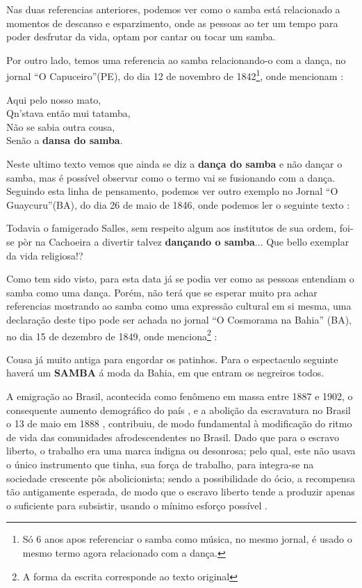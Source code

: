 Nas duas referencias anteriores, 
podemos ver como o samba está relacionado a momentos de descanso e esparzimento, 
onde as pessoas ao ter um tempo para poder desfrutar da vida,
optam por cantar ou tocar um samba.

Por outro lado, temos uma referencia ao samba relacionando-o com a dança, no jornal ``O Capuceiro''(PE),
do dia 12 de novembro de 1842\footnote{Só 6 anos apos referenciar o samba como música, 
no mesmo jornal, é usado o mesmo termo agora relacionado com a dança.}, 
onde mencionam \cite[pp. 5]{sambaperiodicoocapuceiro2}:
\begin{citando}%
Aqui pelo nosso mato,\\
Qn'stava então mui tatamba,\\
Não se sabia outra cousa,\\
Senão a \textbf{dansa do samba}.
\end{citando}
Neste ultimo texto vemos que ainda se diz a \textbf{dança do samba} e não dançar o samba,
mas é possível observar como o termo vai se fusionando com a dança.
Seguindo esta linha de pensamento, 
podemos ver outro exemplo no Jornal ``O Guaycuru''(BA), do dia 26 de maio de 1846,
onde podemos ler o seguinte texto \cite[pp. 2]{sambaperiodicooguaycuru}:
\begin{citando}%
Todavia o famigerado Salles, sem respeito algum aos institutos de sua ordem, 
foi-se pòr na Cachoeira a divertir talvez \textbf{dançando o samba}...
Que bello exemplar da vida religiosa!?
\end{citando}
Como tem sido visto, 
para esta data já se podia ver como as pessoas entendiam o samba como uma dança.
Porém, não terá que se esperar muito pra achar referencias mostrando ao samba
como uma expressão cultural em si mesma, 
uma declaração deste tipo pode ser achada no jornal ``O Cosmorama na Bahia'' (BA), 
no dia 15 de dezembro de 1849, onde menciona\footnote{\label{footort3}A forma da escrita corresponde ao texto original} \cite[pp. 2]{sambaperiodicoocosmorama}:
\begin{citando}%
Cousa já muito antiga para engordar os patinhos. 
Para o espectaculo seguinte haverá um \textbf{SAMBA} á moda da Bahia, 
em que entram os negreiros todos.
\end{citando}



A emigração ao Brasil, acontecida como fenômeno em massa   entre 1887 e 1902,
o consequente aumento demográfico do país \cite[pp. 18]{trento1989outro}, e 
a abolição da escravatura no Brasil o 13 de maio em 1888 \cite[pp. 117]{dorigny2019abolicoes},
contribuiu, de modo fundamental à modificação do ritmo de vida das comunidades
afrodescendentes no Brasil.
Dado que para o escravo liberto, o trabalho era uma marca indigna ou desonrosa;
pelo qual, este não usava  o único instrumento que tinha, sua força de trabalho, 
para  integra-se na sociedade crescente pôs abolicionista; 
sendo a possibilidade do ócio, a recompensa tão antigamente esperada, 
de modo que o escravo liberto tende a produzir apenas o suficiente para subsistir,
usando o mínimo esforço possível \cite[pp. 28]{durham1966assimilacao} \cite[pp. 25]{trento1989outro}.

